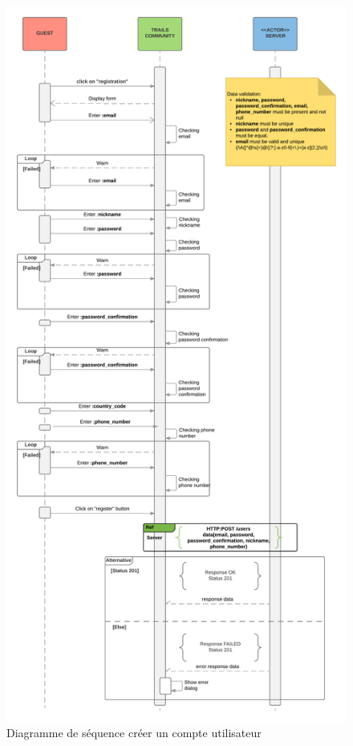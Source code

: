 \documentclass[titlepage, 12pt]{report}
\begin{document}
\begin{figure}[!h]
	\caption{Diagramme de séquence créer un compte utilisateur}
	\label{register_sequence_diagram}
	\centering
	\includegraphics[scale=0.1]{Images/diagram/registration_sequence_diagram.png}
\end{figure}
\end{document}
